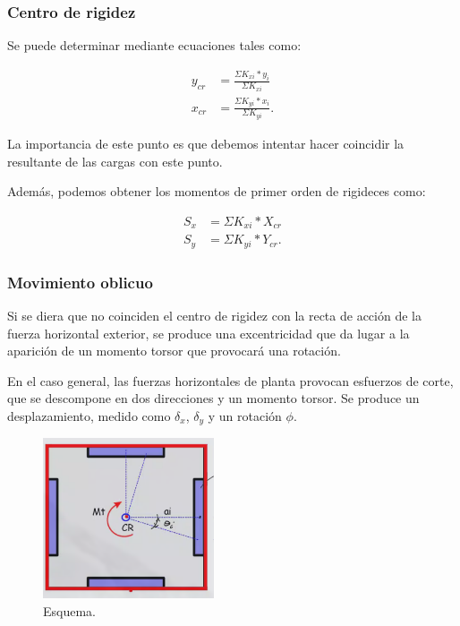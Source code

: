 \documentclass[../main.tex]{subfiles}
\begin{document}
 \subsubsection{Centro de rigidez}

 Se puede determinar mediante ecuaciones tales como:

 \begin{align*}
   y_{cr} &= \frac{\Sigma K_{xi} * y_i}{\Sigma K_{xi}} \\[5pt]
   x_{cr} &= \frac{\Sigma K_{yi} * x_i}{\Sigma K_{yi}}
 .\end{align*}

La importancia de este punto es que debemos intentar hacer coincidir la 
resultante de las cargas con este punto.

Además, podemos obtener los momentos de primer orden de rigideces como:

\begin{align*}
  S_x &= \Sigma K_{xi} * X_{cr} \\[5pt]
  S_{y} &=  \Sigma K_{yi} * Y_{cr} 
.\end{align*}

\subsubsection{Movimiento oblicuo}

Si se diera que no coinciden el centro de rigidez con la recta de acción de la
fuerza horizontal exterior, se produce una excentricidad que da lugar a la 
aparición de un momento torsor que provocará una rotación. 

En el caso general, las fuerzas horizontales de planta provocan esfuerzos de
corte, que se descompone en dos direcciones y un momento torsor. Se produce
un desplazamiento, medido como $\delta_x$, $\delta_y$ y un rotación $\phi$.

\begin{figure}[htpb]
  \centering
  \includegraphics[width=0.45\textwidth]{../images/20210601/oblicuo}
  \caption{Esquema.}
  \label{fig:oblicuo}
\end{figure}
\end{document}
